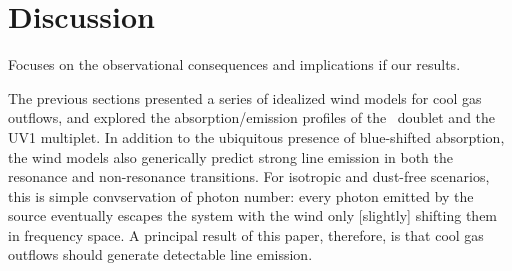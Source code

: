 \documentclass[12pt,preprint]{aastex}
\begin{document}
%     
%
     

\section{Discussion}
\label{sec:discuss}

Focuses on the observational consequences and implications if our results. 

The previous sections presented a series of idealized wind models for
cool gas outflows, and explored the absorption/emission profiles of
the \mgiid\ doublet and the  UV1 multiplet.  In addition to
the ubiquitous presence of blue-shifted absorption, the wind models
also generically predict strong line emission in both the resonance
and non-resonance transitions.  For isotropic and dust-free scenarios,
this is simple convservation of photon number: every photon emitted by
the source eventually escapes the system with the wind only [slightly]
shifting them in frequency space.  A principal result of this paper,
therefore, is that cool gas outflows should generate detectable line
emission.
 
\end{document}
